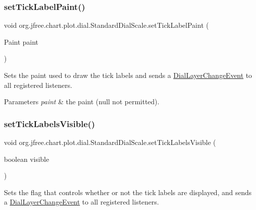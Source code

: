\subsubsection{\texorpdfstring{set\+Tick\+Label\+Paint()}{setTickLabelPaint()}}
{\footnotesize\ttfamily void org.\+jfree.\+chart.\+plot.\+dial.\+Standard\+Dial\+Scale.\+set\+Tick\+Label\+Paint (\begin{DoxyParamCaption}\item[{Paint}]{paint }\end{DoxyParamCaption})}

Sets the paint used to draw the tick labels and sends a \mbox{\hyperlink{classorg_1_1jfree_1_1chart_1_1plot_1_1dial_1_1_dial_layer_change_event}{Dial\+Layer\+Change\+Event}} to all registered listeners.


\begin{DoxyParams}{Parameters}
{\em paint} & the paint ({\ttfamily null} not permitted). \\
\hline
\end{DoxyParams}
\mbox{\label{classorg_1_1jfree_1_1chart_1_1plot_1_1dial_1_1_standard_dial_scale_a24d62a6c1edcfb5c5969fcb338231fe9}} 
\subsubsection{\texorpdfstring{set\+Tick\+Labels\+Visible()}{setTickLabelsVisible()}}
{\footnotesize\ttfamily void org.\+jfree.\+chart.\+plot.\+dial.\+Standard\+Dial\+Scale.\+set\+Tick\+Labels\+Visible (\begin{DoxyParamCaption}\item[{boolean}]{visible }\end{DoxyParamCaption})}

Sets the flag that controls whether or not the tick labels are displayed, and sends a \mbox{\hyperlink{classorg_1_1jfree_1_1chart_1_1plot_1_1dial_1_1_dial_layer_change_event}{Dial\+Layer\+Change\+Event}} to all registered listeners.


